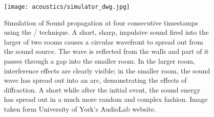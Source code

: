 \begin{figure}[t]
    \begin{fullwidth}
        \centering
        \texttt{[image: acoustics/simulator\_dwg.jpg]}

        \caption{Simulation of Sound propagation at four consecutive timestamps using the \DWM/ technique.
        A short, sharp, impulsive sound fired into the larger of two rooms causes a circular wavefront to spread out from the sound source.
        The wave is reflected from the walls and part of it passes through a gap into the smaller room.
        In the larger room, interference effects are clearly visible;
        in the smaller room, the sound wave has spread out into an arc, demonstrating the effects of diffraction.
        A short while after the initial event, the sound energy has spread out in a much more random and complex fashion.
        Image taken form University of York's AudioLab website.
        }
        \label{fig:acoustics:dwm}
    \end{fullwidth}

\end{figure}






